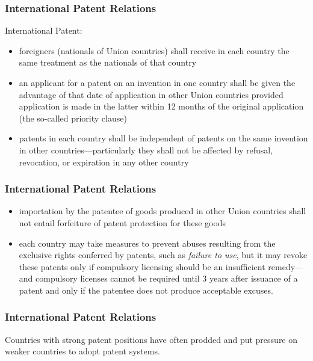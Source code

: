 \begin{frame}
\frametitle{International Patent Relations}
International Patent:
\begin{itemize}
	\item foreigners (nationals of Union countries) shall receive in each country the same treatment as the nationals of that country
    \item an applicant for a patent on an invention in one country shall be given the advantage of that date of application in other Union countries provided application is made in the latter within 12 months of the original application (the so-called priority clause)
    \item patents in each country shall be independent of patents on the same invention in other countries—particularly they shall not be affected by refusal, revocation, or expiration in any other country
\end{itemize}
\end{frame}

\begin{frame}
\frametitle{International Patent Relations}
\begin{itemize}
    \item importation by the patentee of goods produced in other Union countries shall not entail forfeiture of patent protection for these goods
    \item each country may take measures to prevent abuses resulting from the exclusive rights conferred by patents, such as \textit{failure to use}, but it may revoke these patents only if compulsory licensing should be an insufficient remedy—and compulsory licenses cannot be required until 3 years after issuance of a patent and only if the patentee does not produce acceptable excuses.
\end{itemize}
\end{frame}

\begin{frame}
\frametitle{International Patent Relations}
Countries with strong patent positions have often prodded and put pressure on weaker countries to adopt patent systems.
\end{frame}
